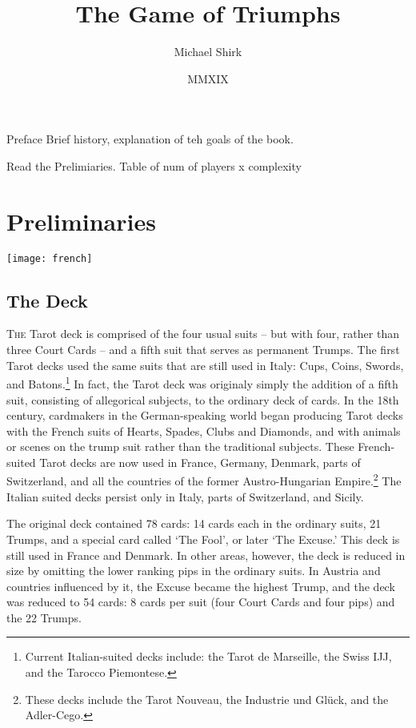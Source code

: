 \documentclass[ebook,12pt,twoside,openright,extrafontsizes,final]{memoir}
\begin{document}
\frontmatter
\title{The Game of Triumphs}
\author{Michael Shirk}
\date{MMXIX}
\maketitle

\tableofcontents


Preface
Brief history,
explanation of teh goals of the book.

Read the Prelimiaries. 
Table of num of players x complexity

\mainmatter

\chapter{Preliminaries}
\texttt{[image: french]}
\section{The Deck}
\lettrine{T}{he} Tarot deck is comprised of the four usual suits – but with four, rather
than three Court Cards – and a fifth suit that serves as permanent Trumps.
The first Tarot decks used the same suits that are still used in Italy:
Cups, Coins, Swords, and Batons.\footnote{Current Italian-suited decks include:
the Tarot de Marseille, the Swiss IJJ, and the Tarocco Piemontese.}  In fact,
the Tarot deck was originaly simply the addition of a fifth suit, consisting 
of allegorical subjects, to the ordinary deck of cards.  In the 18th century, 
cardmakers in the German-speaking world began producing Tarot decks with the French suits
of Hearts, Spades, Clubs and Diamonds, and with animals or scenes on the
trump suit rather than the traditional subjects. These French-suited
Tarot decks are now used in France, Germany, Denmark, parts of Switzerland, 
and all the countries of the former Austro-Hungarian Empire.\footnote{These
decks include the Tarot Nouveau, the Industrie und Glück, and the Adler-Cego.}
The Italian suited decks persist only in Italy, parts of Switzerland, and Sicily.

The original deck contained 78 cards: 14 cards each in the ordinary suits, 
21 Trumps, and a special card called ‘The Fool’, or later ‘The Excuse.’
This deck is still used in France and Denmark.  In other areas, however,
the deck is reduced in size by omitting the lower ranking pips in the ordinary
suits. In Austria and countries influenced by it, the Excuse became the highest
Trump, and the deck was reduced to 54 cards: 8 cards per suit (four Court Cards 
and four pips) and the 22 Trumps.
\end{document}
